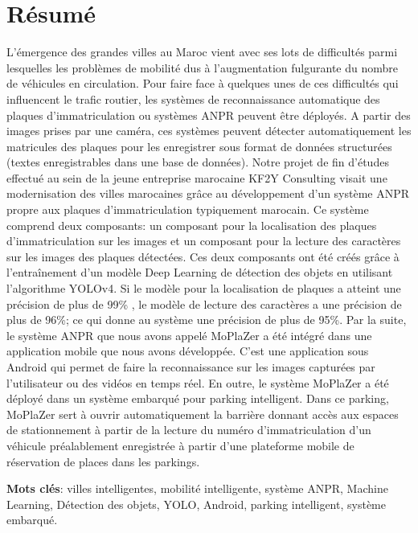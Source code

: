\chapter*{Résumé}
L’émergence des grandes villes au Maroc vient avec ses lots de difficultés parmi lesquelles les problèmes de mobilité dus à l’augmentation fulgurante du nombre de véhicules  en circulation. Pour faire face à quelques unes de ces difficultés qui influencent le trafic routier, les systèmes de reconnaissance automatique des plaques d’immatriculation ou systèmes ANPR peuvent être déployés. A partir des images prises par une caméra, ces systèmes peuvent détecter automatiquement les matricules des plaques pour les enregistrer sous format de données structurées (textes enregistrables dans une base de données). Notre projet de fin d’études effectué au sein de la jeune entreprise marocaine KF2Y Consulting visait une modernisation des villes marocaines grâce au développement d’un système ANPR propre aux plaques d’immatriculation typiquement marocain. Ce système comprend deux composants: un composant pour la localisation des plaques d’immatriculation sur les images et un composant pour la lecture des caractères sur les images des plaques détectées. Ces deux composants ont été créés grâce à l’entraînement d’un modèle Deep Learning de détection des objets en utilisant l’algorithme YOLOv4. Si le modèle pour la localisation de plaques a atteint une précision de plus de 99\% , le modèle de lecture des caractères a une précision de plus de 96\%; ce qui donne au système une précision de plus de 95\%. Par la suite, le système ANPR que nous avons appelé MoPlaZer a été intégré dans une application mobile que nous avons développée. C’est une application sous Android qui permet de faire la reconnaissance sur les images capturées par l’utilisateur ou des vidéos en temps réel. En outre, le système MoPlaZer a été déployé dans un système embarqué pour parking intelligent. Dans ce parking, MoPlaZer sert à ouvrir automatiquement la barrière donnant accès aux espaces de stationnement à partir de la lecture du numéro d’immatriculation d’un véhicule préalablement enregistrée à partir d’une plateforme mobile de réservation de places dans les parkings.


\textbf{Mots clés}: villes intelligentes, mobilité intelligente, système ANPR, Machine Learning, Détection des objets, YOLO, Android, parking intelligent, système embarqué.



